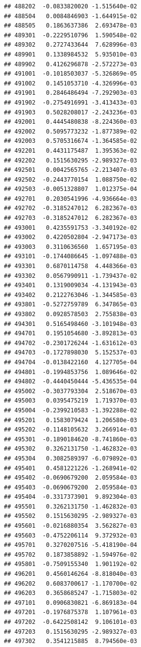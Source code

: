 \documentclass[ignorenonframetext,]{beamer}
\begin{document}
\begin{frame}[fragile]
\begin{verbatim}
## 488202  -0.0833820020 -1.515640e-02
## 488504   0.0084846903 -1.644915e-02
## 488505   0.1863637386  2.693478e-03
## 489301  -0.2229510796  1.590548e-02
## 489302   0.2727433644  7.628996e-03
## 489901   0.1338984532  5.935010e-03
## 489902   0.4126296878 -2.572273e-03
## 491001  -0.1018503037 -5.326869e-05
## 491002   0.1451053710 -4.326996e-03
## 491901   0.2846486494 -7.292903e-03
## 491902  -0.2754916991 -3.413433e-03
## 491903   0.5028208017 -2.243236e-03
## 492001   0.4445480838 -8.224360e-03
## 492002   0.5095773232 -1.877389e-02
## 492003   0.5705316674 -1.364585e-02
## 492201   0.4431175487  1.395363e-02
## 492202   0.1515630295 -2.989327e-03
## 492501   0.0042565765 -2.213407e-03
## 492502  -0.2443770154  1.088750e-02
## 492503  -0.0051328807  1.012375e-04
## 492701   0.2030541996 -4.936664e-03
## 492702  -0.3185247012  6.282367e-03
## 492703  -0.3185247012  6.282367e-03
## 493001   0.4235591753 -3.340192e-02
## 493002   0.4220502804 -2.947173e-03
## 493003   0.3110636560  1.657195e-03
## 493101  -0.1744086645 -1.097488e-03
## 493301   0.6870114758  4.448366e-03
## 493302   0.0567990911 -1.739437e-02
## 493401   0.1319009034 -4.131943e-03
## 493402   0.2122763046 -1.344585e-03
## 493801  -0.5272759789  6.347865e-03
## 493802   0.0928578503  2.755838e-03
## 494301   0.5165498460 -3.101948e-03
## 494701   0.1951054680 -3.892813e-03
## 494702  -0.2301726244 -1.631612e-03
## 494703  -0.1727898030  5.152537e-03
## 494704  -0.0138422160  4.127705e-04
## 494801  -0.1994853756  1.089646e-02
## 494802  -0.4440450444 -5.436535e-04
## 495002  -0.3037793304  2.518670e-03
## 495003   0.0395475219  1.719370e-03
## 495004  -0.2399210583 -1.392288e-02
## 495201   0.1583079424  1.206580e-03
## 495202  -0.1148105632  3.266914e-03
## 495301  -0.1890184620 -8.741860e-03
## 495302   0.3262131750 -1.462832e-03
## 495304   0.3082589397 -6.079892e-03
## 495401   0.4581221226 -1.268941e-02
## 495402  -0.0690679200  2.059584e-03
## 495403  -0.0690679200  2.059584e-03
## 495404  -0.3317373901  9.892304e-03
## 495501   0.3262131750 -1.462832e-03
## 495502   0.1515630295 -2.989327e-03
## 495601  -0.0216880354  3.562827e-03
## 495603  -0.4752206114  9.372932e-03
## 495701   0.3270207516 -5.418190e-04
## 495702   0.1873858892 -1.594976e-02
## 495801  -0.7509155340  1.901192e-02
## 496201   0.4560146264 -8.818040e-03
## 496202   0.6083700617 -1.170700e-02
## 496203   0.3658685247 -1.715803e-02
## 497101   0.0906830821 -6.869183e-04
## 497201  -0.1976875378  1.107961e-03
## 497202  -0.6422508142  9.106101e-03
## 497203   0.1515630295 -2.989327e-03
## 497302   0.3541215885  8.794560e-03

\end{verbatim}
\end{frame}
\end{document}
